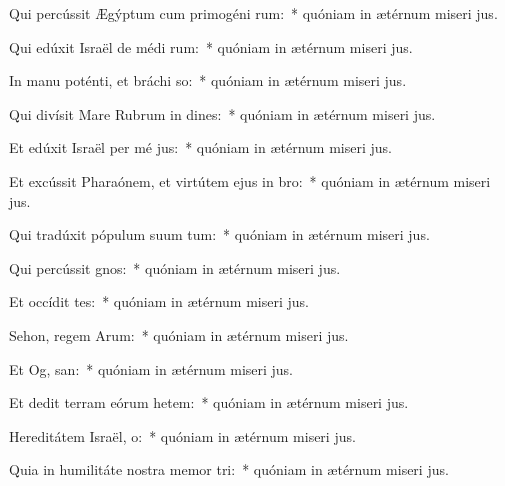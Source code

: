 \item Qui percússit Ægýptum cum primogéni rum:~* quóniam in ætérnum miseri jus.
\item Qui edúxit Israël de médi rum:~* quóniam in ætérnum miseri jus.
\item In manu poténti, et bráchi so:~* quóniam in ætérnum miseri jus.
\item Qui divísit Mare Rubrum in dines:~* quóniam in ætérnum miseri jus.
\item Et edúxit Israël per mé jus:~* quóniam in ætérnum miseri jus.
\item Et excússit Pharaónem, et virtútem ejus in  bro:~* quóniam in ætérnum miseri jus.
\item Qui tradúxit pópulum suum  tum:~* quóniam in ætérnum miseri jus.
\item Qui percússit  gnos:~* quóniam in ætérnum miseri jus.
\item Et occídit  tes:~* quóniam in ætérnum miseri jus.
\item Sehon, regem Arum:~* quóniam in ætérnum miseri jus.
\item Et Og,  san:~* quóniam in ætérnum miseri jus.
\item Et dedit terram eórum hetem:~* quóniam in ætérnum miseri jus.
\item Hereditátem Israël,  o:~* quóniam in ætérnum miseri jus.
\item Quia in humilitáte nostra memor  tri:~* quóniam in ætérnum miseri jus.
